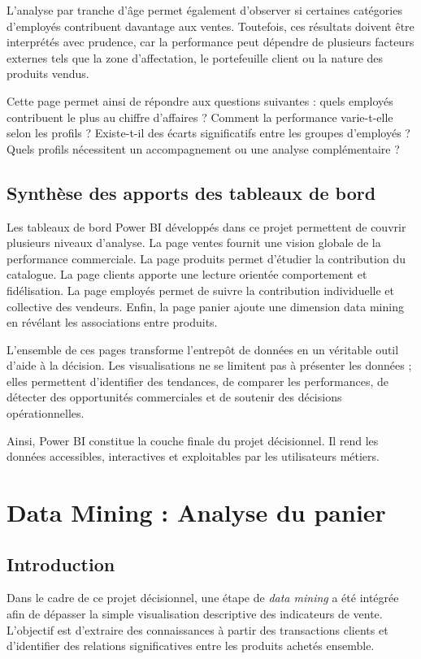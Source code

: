 \documentclass[12pt,a4paper,twoside]{report}
\begin{document}
L'analyse par tranche d'âge permet également d'observer si certaines catégories d'employés contribuent davantage aux ventes. Toutefois, ces résultats doivent être interprétés avec prudence, car la performance peut dépendre de plusieurs facteurs externes tels que la zone d'affectation, le portefeuille client ou la nature des produits vendus.

Cette page permet ainsi de répondre aux questions suivantes : quels employés contribuent le plus au chiffre d'affaires ? Comment la performance varie-t-elle selon les profils ? Existe-t-il des écarts significatifs entre les groupes d'employés ? Quels profils nécessitent un accompagnement ou une analyse complémentaire ?

\section{Synthèse des apports des tableaux de bord}

Les tableaux de bord Power BI développés dans ce projet permettent de couvrir plusieurs niveaux d'analyse. La page ventes fournit une vision globale de la performance commerciale. La page produits permet d'étudier la contribution du catalogue. La page clients apporte une lecture orientée comportement et fidélisation. La page employés permet de suivre la contribution individuelle et collective des vendeurs. Enfin, la page panier ajoute une dimension data mining en révélant les associations entre produits.

L'ensemble de ces pages transforme l'entrepôt de données en un véritable outil d'aide à la décision. Les visualisations ne se limitent pas à présenter les données ; elles permettent d'identifier des tendances, de comparer les performances, de détecter des opportunités commerciales et de soutenir des décisions opérationnelles.

Ainsi, Power BI constitue la couche finale du projet décisionnel. Il rend les données accessibles, interactives et exploitables par les utilisateurs métiers.

\chapter{Data Mining : Analyse du panier}

\section{Introduction}

Dans le cadre de ce projet décisionnel, une étape de \textit{data mining} a été intégrée afin de dépasser la simple visualisation descriptive des indicateurs de vente. L'objectif est d'extraire des connaissances à partir des transactions clients et d'identifier des relations significatives entre les produits achetés ensemble.
\end{document}
